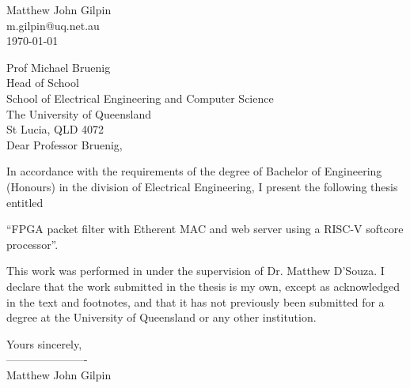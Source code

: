 \fancyhf{}

\begin{flushright}
	Matthew John Gilpin\\
	m.gilpin@uq.net.au\\
	\medskip
	\today
\end{flushright}

\begin{flushleft}
  Prof Michael Bruenig\\
  Head of School\\
  School of Electrical Engineering and Computer Science\\
  The University of Queensland\\
  St Lucia, QLD 4072\\
  \bigskip\bigskip
  Dear Professor Bruenig,
\end{flushleft}

\noindent
In accordance with the requirements of the degree of Bachelor of
Engineering (Honours) in the division of Electrical Engineering,
I present the following thesis entitled 

\vspace{1em}
{\centering “FPGA packet filter with Etherent MAC and web server using a RISC-V softcore processor”.\par}
\vspace{1em}

\noindent This work was performed in under the supervision of
Dr. Matthew D'Souza. I declare that the work submitted in the thesis is my own, 
except as acknowledged in the text and footnotes, and that it has
not previously been submitted for a degree at the University of 
Queensland or any other institution.\bigskip \bigskip

\begin{flushright}
    
	Yours sincerely,\\
	\bigskip
	----------------------\\
	\medskip
	Matthew John Gilpin
\end{flushright}
\clearpage